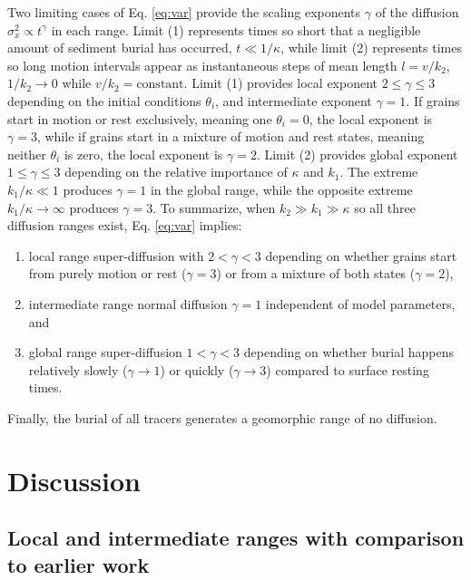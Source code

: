 Two limiting cases of Eq. \ref{eq:var} provide the scaling exponents $\gamma$ of the diffusion $\sigma_x^2 \propto t^\gamma$ in each range. Limit (1) represents times so short that a negligible amount of sediment burial has occurred, $t\ll 1/\kappa$, while limit (2) represents times so long motion intervals appear as instantaneous steps of mean length $l=v/k_2$, $1/k_2 \rightarrow 0$ while $v/k_2 = \text{constant}$.
Limit (1) provides local exponent $2 \leq \gamma \leq 3$ depending on the initial conditions $\theta_i$, and intermediate exponent $\gamma=1$.
If grains start in motion or rest exclusively, meaning one $\theta_i = 0$, the local exponent is $\gamma=3$, while if grains start in a mixture of motion and rest states, meaning neither $\theta_i$ is zero, the local exponent is $\gamma=2$.
Limit (2) provides global exponent $1 \leq \gamma \leq 3$ depending on the relative importance of $\kappa$ and $k_1$.
The extreme $k_1/\kappa \ll 1$ produces $\gamma=1$ in the global range, while the opposite extreme $k_1/\kappa \rightarrow \infty$ produces $\gamma=3$.
To summarize, when $k_2\gg k_1 \gg \kappa$ so all three diffusion ranges exist, Eq. \ref{eq:var} implies:
\begin{enumerate}
	\item local range super-diffusion with $2<\gamma<3$ depending on whether grains start from purely motion or rest ($\gamma=3$) or from a mixture of both states ($\gamma=2$),
	\item intermediate range normal diffusion $\gamma=1$ independent of model parameters, and
	\item global range super-diffusion $1<\gamma<3$ depending on whether burial happens relatively slowly ($\gamma \rightarrow 1$) or quickly ($\gamma \rightarrow 3$) compared to surface resting times.
\end{enumerate}
Finally, the burial of all tracers generates a geomorphic range of no diffusion.

\section{Discussion}
\label{sec:discussion}

\subsection{Local and intermediate ranges with comparison to earlier work}

